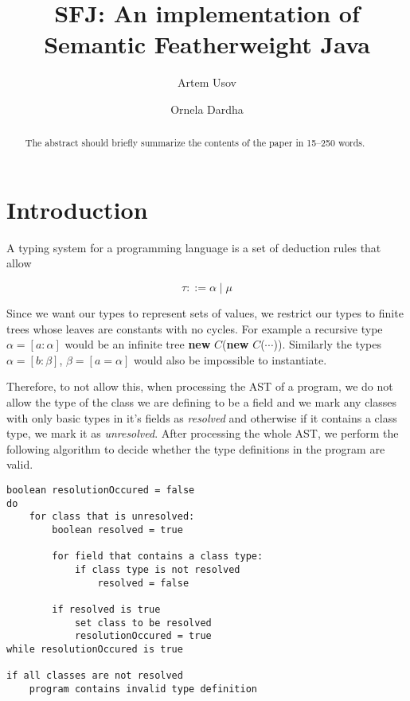 \documentclass[runningheads]{llncs}
\begin{document}
\title{SFJ: An implementation of Semantic Featherweight Java}

\author{Artem Usov \and Ornela Dardha}


\maketitle

\begin{abstract}
    The abstract should briefly summarize the contents of the paper in 15--250 words.

\end{abstract}


\section{Introduction}

A typing system for a programming language is a set of deduction rules that allow 


\begin{equation}
    \tau ::= \alpha \mid \mu
\end{equation}



Since we want our types to represent sets of values, we restrict our types to finite trees whose 
leaves are constants with no cycles. For example a recursive type $\alpha = [a : \alpha]$ would
be an infinite tree \textbf{new} $C$(\textbf{new} $C$($\cdots{}$)). Similarly the types $\alpha = 
[b: \beta]$, $\beta = [a = \alpha]$ would also be impossible to instantiate. 

Therefore, to not allow this, when processing the AST of a program, we do not allow the type of 
the class we are defining to be a field and we mark any classes with only basic types in it's fields
as \textit{resolved} and otherwise if it contains a class type, we mark it as \textit{unresolved}. 
After processing the whole AST, we perform the following algorithm to decide whether the type 
definitions in the program are valid.

\begin{verbatim}
boolean resolutionOccured = false
do 
    for class that is unresolved:
        boolean resolved = true

        for field that contains a class type:
            if class type is not resolved 
                resolved = false
        
        if resolved is true
            set class to be resolved
            resolutionOccured = true
while resolutionOccured is true

if all classes are not resolved
    program contains invalid type definition
\end{verbatim}
\end{document}

